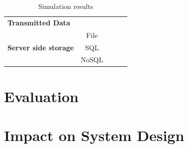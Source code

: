 \begin{table}[h]
\begin{tabular}{l|c|c|c|c}
                                                         & \cellcolor{red}                                                           &\cellcolor{yellow}                                      &\cellcolor{yellow}                                                & \cellcolor{red}                                       \\ \hline
\multirow{2}{*}{\textbf{Transmitted Data}}               & \cellcolor{green}                                                           & \cellcolor{green}                                       & \cellcolor{green}                                                 & \cellcolor{red}                                       \\ \cline{2-5} 
                                                         & \cellcolor{red}                                                           & \cellcolor{red}                                       & \cellcolor{red}                                                 & \cellcolor{green}                                       \\ \hline
\multirow{3}{*}{\textbf{Server side storage}}            & File                                                        &\cellcolor{yellow}                                      & \cellcolor{purple}                                                 &\cellcolor{yellow}                                      \\ \cline{2-5} 
                                                         & SQL                                                         &\cellcolor{yellow}                                      & \cellcolor{purple}                                                 &\cellcolor{yellow}                                      \\ \cline{2-5} 
                                                         & NoSQL                                                       &\cellcolor{yellow}                                      & \cellcolor{purple}                                                 &\cellcolor{yellow}                                      \\ \hline
\end{tabular}
\caption{Simulation results}
\label{tab:SimulationResults}
\end{table}

\section{Evaluation}

\section{Impact on System Design}